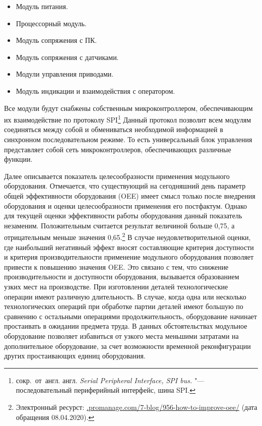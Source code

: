 \begin{itemize}
\item Модуль питания.
\item Процессорный модуль.
\item Модуль сопряжения с ПК.
\item Модуль сопряжения с датчиками.
\item Модули управления приводами.
\item Модуль индикации и взаимодействия с оператором.
\end{itemize}

Все модули будут снабжены собственным микроконтроллером, обеспечивающим их взаимодействие по протоколу SPI\footnote{сокр.~от~англ. англ. \textit{Serial Peripheral Interface, SPI bus.} "--- последовательный периферийный интерфейс, шина SPI.} Данный протокол позволит всем модулям соединяться между собой и обмениваться необходимой информацией в синхронном последовательном режиме. То есть универсальный блок управления представляет собой сеть микроконтроллеров, обеспечивающих различные функции. 

Далее описывается показатель целесообразности применения модульного оборудования. Отмечается, что существующий на сегодняшний день параметр общей эффективности оборудования (OEE) имеет смысл только после внедрения оборудования и оценки целесообразности применения его постфактум. Однако для текущей оценки эффективности работы оборудования данный показатель незаменим. Положительным считается результат величиной больше 0,75, а отрицательным меньше значения 0,65.\footnote{Электронный ресурст: \url{.promanage.com/7-blog/956-how-to-improve-oee/} (дата обращения 08.04.2020).} В случае неудовлетворительной оценки, где наибольший негативный эффект вносят составляющие критерия доступности и критерия производительности применение модульного оборудования позволяет привести к повышению значения OEE. Это связано с тем, что снижение производительности и доступности оборудования, вызывается образованием узких мест на производстве. При изготовлении деталей технологические операции имеют различную длительность. В случае, когда одна или несколько технологических операций при обработке партии деталей имеют большую по сравнению с остальными операциями продолжительность, оборудование начинает простаивать в ожидании предмета труда. В данных обстоятельствах модульное оборудование позволяет избавиться от узкого места меньшими затратами на дополнительное оборудование, за счет возможности временной реконфигурации других простаивающих единиц оборудования. 

